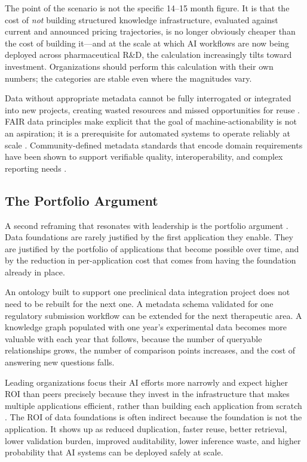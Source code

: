 \documentclass[man,12pt,donotrepeattitle]{apa7}
\begin{document}
The point of the scenario is not the specific 14--15 month figure. It is
that the cost of \textit{not} building structured knowledge infrastructure,
evaluated against current and announced pricing trajectories, is no longer
obviously cheaper than the cost of building it---and at the scale at which
AI workflows are now being deployed across pharmaceutical R\&D, the
calculation increasingly tilts toward investment. Organizations should
perform this calculation with their own numbers; the categories are stable
even where the magnitudes vary.

Data without appropriate metadata cannot be fully interrogated or integrated
into new projects, creating wasted resources and missed opportunities for
reuse \parencite{moresis2024}. FAIR data principles make explicit that the
goal of machine-actionability is not an aspiration; it is a prerequisite for
automated systems to operate reliably at scale \parencite{wilkinson2016}.
Community-defined metadata standards that encode domain requirements have
been shown to support verifiable quality, interoperability, and complex
reporting needs \parencite{batista2022,musen2022}.

\subsection{The Portfolio Argument}

A second reframing that resonates with leadership is the portfolio argument
\parencite{vereckey2025}. Data foundations are rarely justified by the first
application they enable. They are justified by the portfolio of applications
that become possible over time, and by the reduction in per-application cost
that comes from having the foundation already in place.

An ontology built to support one preclinical data integration project does
not need to be rebuilt for the next one. A metadata schema validated for one
regulatory submission workflow can be extended for the next therapeutic area.
A knowledge graph populated with one year's experimental data becomes more
valuable with each year that follows, because the number of queryable
relationships grows, the number of comparison points increases, and the cost
of answering new questions falls.

Leading organizations focus their AI efforts more narrowly and expect higher
ROI than peers precisely because they invest in the infrastructure that makes
multiple applications efficient, rather than building each application from
scratch \parencite{apotheker2025}. The ROI of data foundations is often
indirect because the foundation is not the application. It shows up as
reduced duplication, faster reuse, better retrieval, lower validation burden,
improved auditability, lower inference waste, and higher probability that AI
systems can be deployed safely at scale.
\end{document}
